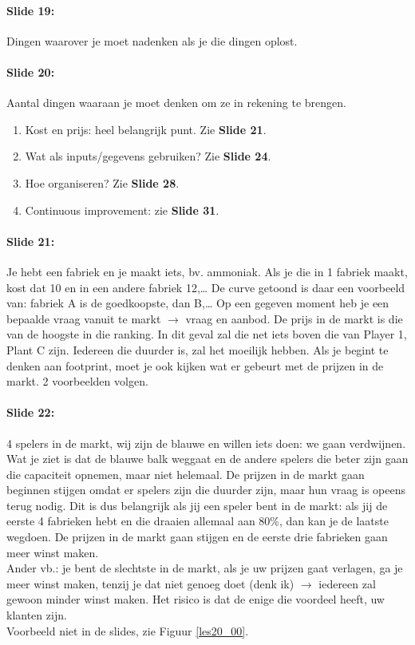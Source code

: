 \documentclass[10pt,a4paper]{report}
\begin{document}
\paragraph{Slide 19:} Dingen waarover je moet nadenken als je die dingen oplost.

\paragraph{Slide 20:} Aantal dingen waaraan je moet denken om ze in rekening te brengen. 
\begin{enumerate}
\item Kost en prijs: heel belangrijk punt. Zie \textbf{Slide 21}.
\item Wat als inputs/gegevens gebruiken? Zie \textbf{Slide 24}.
\item Hoe organiseren? Zie \textbf{Slide 28}.
\item Continuous improvement: zie \textbf{Slide 31}.
\end{enumerate}

\paragraph{Slide 21:} Je hebt een fabriek en je maakt iets, bv. ammoniak. Als je die in 1 fabriek maakt, kost dat 10 en in een andere fabriek 12,… De curve getoond is daar een voorbeeld van: fabriek A is de goedkoopste, dan B,… Op een gegeven moment heb je een bepaalde vraag vanuit te markt $\rightarrow$ vraag en aanbod. De prijs in de markt is die van de hoogste in die ranking. In dit geval zal die net iets boven die van Player 1, Plant C zijn. Iedereen die duurder is, zal het moeilijk hebben. Als je begint te denken aan footprint, moet je ook kijken wat er gebeurt met de prijzen in de markt. 2 voorbeelden volgen.

\paragraph{Slide 22:} 4 spelers in de markt, wij zijn de blauwe en willen iets doen: we gaan verdwijnen. Wat je ziet is dat de blauwe balk weggaat en de andere spelers die beter zijn gaan die capaciteit opnemen, maar niet helemaal. De prijzen in de markt gaan beginnen stijgen omdat er spelers zijn die duurder zijn, maar hun vraag is opeens terug nodig. Dit is dus belangrijk als jij een speler bent in de markt: als jij de eerste 4 fabrieken hebt en die draaien allemaal aan 80\%, dan kan je de laatste wegdoen. De prijzen in de markt gaan stijgen en de eerste drie fabrieken gaan meer winst maken.\\
Ander vb.: je bent de slechtste in de markt, als je uw prijzen gaat verlagen, ga je meer winst maken, tenzij je dat niet genoeg doet (denk ik) $\rightarrow$ iedereen zal gewoon minder winst maken. Het risico is dat de enige die voordeel heeft, uw klanten zijn. \\
Voorbeeld niet in de slides, zie Figuur \ref{les20_00}. 
\end{document}
